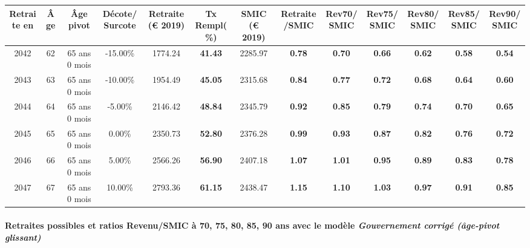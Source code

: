 { \scriptsize \begin{center} 
\begin{tabular}[htb]{|c|c||c|c||c|c||c||c|c|c|c|c|c|} 
\hline 
 Retraite en &  Âge &  Âge pivot &  Décote/Surcote &  Retraite (\euro{} 2019) &  Tx Rempl(\%) &  SMIC (\euro{} 2019) &  Retraite/SMIC &  Rev70/SMIC &  Rev75/SMIC &  Rev80/SMIC &  Rev85/SMIC &  Rev90/SMIC \\ 
\hline \hline 
 2042 &  62 &  65 ans 0 mois &  -15.00\% &  1774.24 &  {\bf 41.43} &  2285.97 &  {\bf {\color{red} 0.78}} &  {\bf {\color{red} 0.70}} &  {\bf {\color{red} 0.66}} &  {\bf {\color{red} 0.62}} &  {\bf {\color{red} 0.58}} &  {\bf {\color{red} 0.54}} \\ 
\hline 
 2043 &  63 &  65 ans 0 mois &  -10.00\% &  1954.49 &  {\bf 45.05} &  2315.68 &  {\bf {\color{red} 0.84}} &  {\bf {\color{red} 0.77}} &  {\bf {\color{red} 0.72}} &  {\bf {\color{red} 0.68}} &  {\bf {\color{red} 0.64}} &  {\bf {\color{red} 0.60}} \\ 
\hline 
 2044 &  64 &  65 ans 0 mois &  -5.00\% &  2146.42 &  {\bf 48.84} &  2345.79 &  {\bf {\color{red} 0.92}} &  {\bf {\color{red} 0.85}} &  {\bf {\color{red} 0.79}} &  {\bf {\color{red} 0.74}} &  {\bf {\color{red} 0.70}} &  {\bf {\color{red} 0.65}} \\ 
\hline 
 2045 &  65 &  65 ans 0 mois &  0.00\% &  2350.73 &  {\bf 52.80} &  2376.28 &  {\bf {\color{red} 0.99}} &  {\bf {\color{red} 0.93}} &  {\bf {\color{red} 0.87}} &  {\bf {\color{red} 0.82}} &  {\bf {\color{red} 0.76}} &  {\bf {\color{red} 0.72}} \\ 
\hline 
 2046 &  66 &  65 ans 0 mois &  5.00\% &  2566.26 &  {\bf 56.90} &  2407.18 &  {\bf 1.07} &  {\bf 1.01} &  {\bf {\color{red} 0.95}} &  {\bf {\color{red} 0.89}} &  {\bf {\color{red} 0.83}} &  {\bf {\color{red} 0.78}} \\ 
\hline 
 2047 &  67 &  65 ans 0 mois &  10.00\% &  2793.36 &  {\bf 61.15} &  2438.47 &  {\bf 1.15} &  {\bf 1.10} &  {\bf 1.03} &  {\bf {\color{red} 0.97}} &  {\bf {\color{red} 0.91}} &  {\bf {\color{red} 0.85}} \\ 
\hline 
\hline 
\end{tabular} 
\end{center} } 
\paragraph{Retraites possibles et ratios Revenu/SMIC à 70, 75, 80, 85, 90 ans avec le modèle \emph{Gouvernement corrigé (âge-pivot glissant)}}  
 
